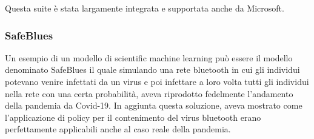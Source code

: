 Questa suite è stata largamente integrata e supportata anche da Microsoft.

\subsubsection*{SafeBlues}
Un esempio di un modello di scientific machine learning può essere il modello 
denominato SafeBlues il quale simulando una rete bluetooth in cui gli individui 
potevano venire infettati da un virus e poi infettare a loro volta tutti gli individui 
nella rete con una certa probabilità, aveva riprodotto fedelmente l’andamento della pandemia da Covid-19. 
In aggiunta questa soluzione, aveva mostrato come l’applicazione di policy per il 
contenimento del virus bluetooth erano perfettamente applicabili anche al caso reale della pandemia. 
